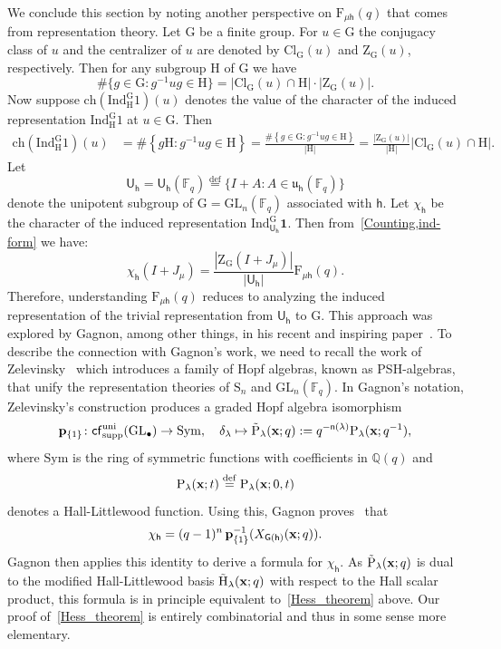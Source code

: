 \documentclass[12pt,a4paper,reqno]{amsart}
\theoremstyle{plain}
\theoremstyle{definition}
\newcommand{\defin}{\overset{\mathrm{def}}{=}}
\newcommand{\FF}{{\mathbb{F}}}
\newcommand{\1}{\mathds{1}}
\newcommand{\G}{{\mathrm{G}}}
\newcommand{\GL}{\mathrm{GL}}
\renewcommand{\P}{\mathrm{P}}
\newcommand{\F}{\mathrm{F}}
\newcommand{\HH}{\mathrm{H}}
\newcommand{\Ind}{\mathrm{Ind}}
\newcommand{\conj}{\mathrm{Cl}_\G}
\newcommand{\cen}{\mathrm{Z}_\G}
\newcommand{\Z}{\mathrm{Z}}
\renewcommand{\u}{\mathfrak{u}}
\newcommand{\x}{{\bf x}}
\newcommand{\U}{\mathsf{U}}
\newcommand{\fn}{\mathsf{n}}
\newcommand{\hes}{\mathsf{h}}
\newcommand{\graph}{\mathsf{G}}
\begin{document}
We conclude this section by noting  another perspective on $\F_{\mu\hes}(q)$ that comes from representation theory. Let $\G$ be a finite group. For $u\in \G$ the conjugacy class of $u$ and the centralizer of $u$ are denoted by  $\conj(u)$ and $\cen(u)$, respectively. 
Then for any subgroup $\HH$ of $\G$ we have
\begin{equation}\label{Counting}
    \#\{g\in \G: g^{-1}ug\in \HH\}= |\conj(u)\cap \HH|\cdot |\cen(u)|.
\end{equation}   
Now suppose $\mathrm{ch}(\Ind_{\HH}^{\G}1)(u)$ denotes the value of the character of the induced representation $\Ind_{\HH}^{\G}1$ at $u\in\G$. Then 
\begin{align}\label{ind-form}
\mathrm{ch}(\Ind_{\HH}^{\G}1)(u)&=\#\left\{g\HH: g^{-1}ug\in \HH\right\}
=
\frac{\#\left\{g\in \G: g^{-1}ug\in \HH\right\}}{|\HH|}=\frac{ |\cen(u)|}{|\HH|}|\conj(u)\cap \HH|. 
\end{align}
Let
\begin{equation}\label{U_hes:eq}
\U_\hes=\U_\hes(\FF_q) \defin \{I + A : A \in \u_\hes(\FF_q)\}
\end{equation}
denote the unipotent subgroup of $\G=\GL_n(\FF_q)$ associated with $\hes$. Let $\chi_\hes$ be the character of the induced representation $\Ind_{\U_\hes}^\G \mathbf{1}$. Then from~\cref{Counting,ind-form} we have:
\begin{equation}\label{ind-form-char}
\chi_\hes(I + J_\mu) = \frac{|\Z_\G(I + J_\mu)|}{|\U_\hes|} \F_{\mu\hes}(q).
\end{equation}
Therefore, understanding $\F_{\mu\hes}(q)$ reduces to analyzing the induced representation of the trivial representation from $\U_\hes$ to $\G$. This approach was explored by Gagnon, among other things, in his recent and inspiring paper~\cite{Gagnon}. To describe the connection with Gagnon's work, we need to recall the work of  Zelevinsky~\cite{Zelevinsky} which introduces a family of Hopf algebras, known as PSH-algebras, that unify the representation theories of $\mathrm{S}_n$ and $\GL_n(\FF_q)$. In Gagnon's notation, Zelevinsky's construction produces a graded Hopf algebra isomorphism
\[
\mathbf{p}_{\{1\}} \colon \mathsf{cf}^{\mathrm{uni}}_{\mathrm{supp}}(\mathrm{GL}_\bullet) \to \mathrm{Sym}, \quad \delta_\lambda \mapsto \tilde{\P}_\lambda(\x; q) := q^{-\fn(\lambda)} \P_\lambda(\x; q^{-1}),
\]
where $\mathrm{Sym}$ is the ring of symmetric functions with coefficients in $\mathbb Q(q)$ and \[
\P_\lambda(\x; t)\defin\P_\lambda(\x;0,t)
\] denotes a Hall-Littlewood  function. Using this, Gagnon proves~\cite[Theorem 3.1]{Gagnon} that 
\[
\chi_\hes = (q - 1)^n \, \mathbf{p}_{\{1\}}^{-1}(X_{\graph(\hes)}(\x; q)).
\]
Gagnon then applies this identity to derive a formula for $\chi_\hes$. As 
$\tilde{\P}_\lambda(\x; q)$ is dual to the modified Hall-Littlewood basis $\tilde{\HH}_\lambda(\x;q)$ with respect to the Hall scalar product, this formula is in principle equivalent to~\cref{Hess_theorem} above. Our proof of~\cref{Hess_theorem} is entirely combinatorial and thus in some sense more elementary.
\end{document}

